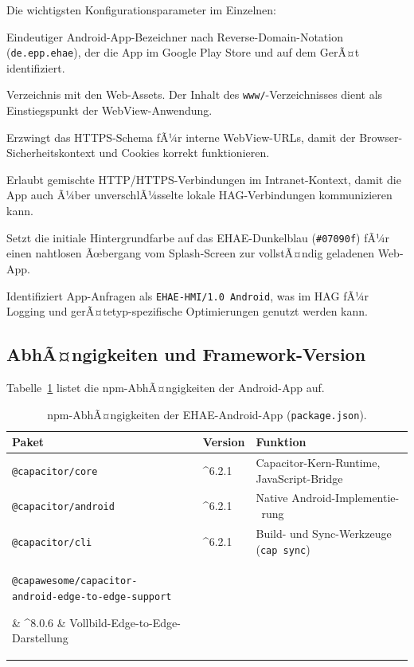 ﻿\documentclass[12pt,a4paper]{article}
\begin{document}
Die wichtigsten Konfigurationsparameter im Einzelnen:

\begin{description}[leftmargin=2em]
  \item[\texttt{appId}] Eindeutiger Android-App-Bezeichner nach Reverse-Domain-Notation
    (\texttt{de.epp.ehae}), der die App im Google Play Store und auf dem GerÃ¤t identifiziert.
  \item[\texttt{webDir}] Verzeichnis mit den Web-Assets. Der Inhalt des
    \texttt{www/}-Verzeichnisses dient als Einstiegspunkt der WebView-Anwendung.
  \item[\texttt{androidScheme: "https"}] Erzwingt das HTTPS-Schema fÃ¼r interne
    WebView-URLs, damit der Browser-Sicherheitskontext und Cookies korrekt
    funktionieren.
  \item[\texttt{allowMixedContent}] Erlaubt gemischte HTTP/HTTPS-Verbindungen im
    Intranet-Kontext, damit die App auch Ã¼ber unverschlÃ¼sselte lokale HAG-Verbindungen
    kommunizieren kann.
  \item[\texttt{backgroundColor}] Setzt die initiale Hintergrundfarbe auf das
    EHAE-Dunkelblau (\texttt{\#07090f}) fÃ¼r einen nahtlosen Ãœbergang vom Splash-Screen
    zur vollstÃ¤ndig geladenen Web-App.
  \item[\texttt{overrideUserAgent}] Identifiziert App-Anfragen als
    \texttt{EHAE-HMI/1.0 Android}, was im HAG fÃ¼r Logging und
    gerÃ¤tetyp-spezifische Optimierungen genutzt werden kann.
\end{description}

\subsection{AbhÃ¤ngigkeiten und Framework-Version}

Tabelle~\ref{tab:npm_deps} listet die npm-AbhÃ¤ngigkeiten der Android-App auf.

\begin{table}[h]
\centering
\caption{npm-AbhÃ¤ngigkeiten der EHAE-Android-App (\texttt{package.json}).}
\label{tab:npm_deps}
\begin{tabularx}{\textwidth}{llX}
\toprule
\textbf{Paket} & \textbf{Version} & \textbf{Funktion} \\
\midrule
\texttt{@capacitor/core}    & \textasciicircum{}6.2.1 & Capacitor-Kern-Runtime, JavaScript-Bridge \\
\texttt{@capacitor/android} & \textasciicircum{}6.2.1 & Native Android-Implementie-\ rung \\
\texttt{@capacitor/cli}     & \textasciicircum{}6.2.1 & Build- und Sync-Werkzeuge (\texttt{cap sync}) \\
\parbox[t]{5cm}{\raggedright\texttt{@capawesome/capacitor-}\\\texttt{android-edge-to-edge-support}}
                            & \textasciicircum{}8.0.6 & Vollbild-Edge-to-Edge-Darstellung \\
\bottomrule
\end{tabularx}
\end{table}
\end{document}
